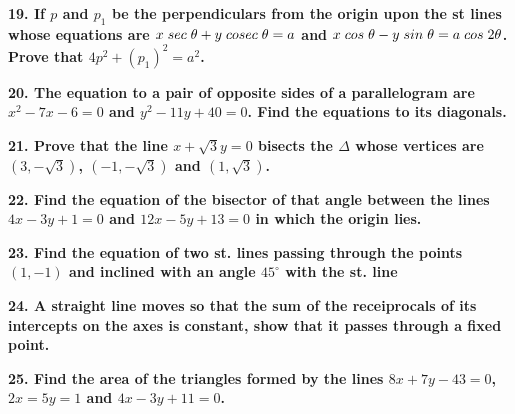 \documentclass{article}
\begin{document}
\begin{flushleft}
\vspace{0.2cm}
\newpage
\textbf{19. If $p$ and $p_1$ be the perpendiculars from the origin upon the st lines whose equations are $x\hspace{0.1cm} sec\hspace{0.1cm}\theta+y \hspace{0.1cm}cosec\hspace{0.1cm} \theta = a$ and $x\hspace{0.1cm} cos\hspace{0.1cm}\theta - y \hspace{0.1cm}sin \hspace{0.1cm}\theta = a \hspace{0.1cm}cos\hspace{0.1cm} 2\theta $. Prove that $4p^2 + (p_1)^2 = a^2$.}\par
\vspace{0.2cm}
\textbf{20. The equation to a pair of opposite sides of a parallelogram are $x^2 -7x -6 = 0$ and $y^2 -11y  +40 =0$. Find the equations to its diagonals.}\par
\textbf{21. Prove that the line $x+\sqrt{3}y = 0$ bisects the $\Delta$ whose vertices are $(3,-\sqrt{3})$, $(-1,-\sqrt{3})$ and $(1,\sqrt{3})$.}\par
\vspace{0.2cm}
\textbf{22. Find the equation of the bisector of that angle between the lines $4x-3y+1 =0 $ and $12x - 5y +13 =0 $ in which the origin lies. }\par
\vspace{0.2cm}
\textbf{23. Find the equation of two st. lines passing through the points $(1,-1)$ and inclined with an angle $45^\circ$ with the st. line }\par
\vspace{0.2cm}
\textbf{24. A straight line moves so that the sum of the receiprocals of its intercepts on the axes is constant, show that it passes through a fixed point.}\par
\vspace{0.2cm}
\textbf{25. Find the area of the triangles formed by the lines $8x+7y-43=0$, $2x=5y = 1$ and $4x-3y+11 = 0$.}\par


\end{flushleft}
\end{document}
